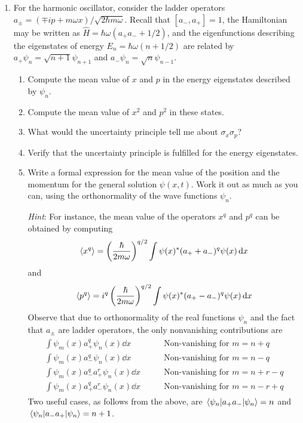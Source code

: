 \documentclass[../psets.tex]{subfiles}
\begin{document}
\begin{enumerate}
\begin{enumerate}
    \end{enumerate}
    \item For the harmonic oscillator, consider the ladder operators $a_\pm=(\mp ip+m\omega x)/\sqrt{2\hbar m\omega}$. Recall that $[a_-,a_+]=1$, the Hamiltonian may be written as $\hat{H}=\hbar\omega(a_+a_-+1/2)$, and the eigenfunctions describing the eigenstates of energy $E_n=\hbar\omega(n+1/2)$ are related by $a_+\psi_n=\sqrt{n+1}\psi_{n+1}$ and $a_-\psi_n=\sqrt{n}\psi_{n-1}$.
    \begin{enumerate}
        \item Compute the mean value of $x$ and $p$ in the energy eigenstates described by $\psi_n$.
        \item Compute the mean value of $x^2$ and $p^2$ in these states.
        \item What would the uncertainty principle tell me about $\sigma_x\sigma_p$?
        \item Verify that the uncertainty principle is fulfilled for the energy eigenstates.
        \item Write a formal expression for the mean value of the position and the momentum for the general solution $\psi(x,t)$. Work it out as much as you can, using the orthonormality of the wave functions $\psi_n$.\par
        \emph{Hint}: For instance, the mean value of the operators $x^q$ and $p^q$ can be obtained by computing
        \begin{equation}
            \langle{x^q}\rangle = \left( \frac{\hbar}{2m\omega} \right)^{q/2}\int\psi(x)^*(a_++a_-)^q\psi(x)\dd{x}
        \end{equation}
        and
        \begin{equation}
            \langle{p^q}\rangle = i^q\left( \frac{\hbar}{2m\omega} \right)^{q/2}\int\psi(x)^*(a_+-a_-)^q\psi(x)\dd{x}
        \end{equation}
        Observe that due to orthonormality of the real functions $\psi_n$ and the fact that $a_\pm$ are ladder operators, the only nonvanishing contributions are
        \begin{align}
            \begin{split}
                \int\psi_m(x)a_+^q\psi_n(x)\dd{x} &\qquad \text{Non-vanishing for }m=n+q\\
                \int\psi_m(x)a_-^q\psi_n(x)\dd{x} &\qquad \text{Non-vanishing for }m=n-q\\
                \int\psi_m(x)a_-^qa_+^r\psi_n(x)\dd{x} &\qquad \text{Non-vanishing for }m=n+r-q\\
                \int\psi_m(x)a_+^qa_-^r\psi_n(x)\dd{x} &\qquad \text{Non-vanishing for }m=n-r+q
            \end{split}
        \end{align}
        Two useful cases, as follows from the above, are $\ev{a_+a_-}{\psi_n}=n$ and $\ev{a_-a_+}{\psi_n}=n+1$.
    \end{enumerate}
\end{enumerate}
\end{document}
